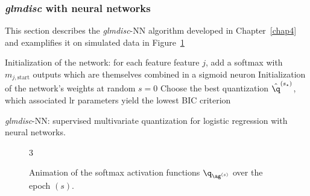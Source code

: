 \subsubsection{\textit{glmdisc} with neural networks} \label{app1:glmdiscNN}

This section describes the \textit{glmdisc}-NN algorithm developed in Chapter~\ref{chap4} and examplifies it on simulated data in Figure~\ref{fig:animNN}

\begin{algorithm}[H]
 Initialization of the network: for each feature feature $j$, add a softmax with $m_{j,\text{start}}$ outputs which are themselves combined in a sigmoid neuron\;
 Initialization of the network's weights at random\;
 $s = 0$\;
 Choose the best quantization $\hat{\q}^{(s_\star)}$, which associated \gls{lr} parameters yield the lowest BIC criterion\;
 \caption{\label{NN-disc} \textit{glmdisc}-NN: supervised multivariate quantization for logistic regression with neural networks.}
\end{algorithm}

\begin{figure}[!h]
\begin{animateinline}[poster=first, controls=all, palindrome, autopause, autoresume, width=\textwidth, height=6cm]{3}
%
\end{animateinline}
\caption{\label{fig:animNN} Animation of the softmax activation functions $\q_{\ag^{(s)}}$ over the epoch $(s)$.}
\end{figure}



